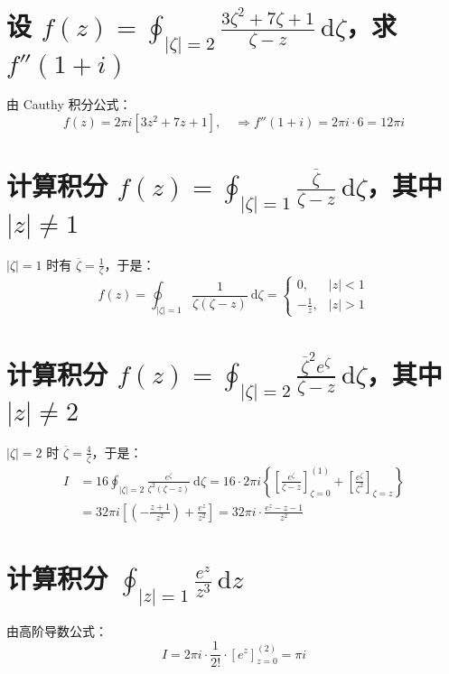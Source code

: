 \documentclass[UTF8]{report}
\theoremstyle{MyLineTheoremStyle} %
\theoremstyle{MyBlockTheoremStyle} %
\theoremstyle{MySubsubsectionStyle} %
\begin{document}
\section{设 $\displaystyle f(z) = \oint_{| \zeta  |= 2} \frac{3 \zeta^2 + 7 \zeta + 1}{\zeta - z} \ \mathrm{d}\zeta $，求 $f''(1+i)$}

由 Cauthy 积分公式：
\begin{equation}
f(z) = 2 \pi i \left[ 3z^2 + 7z + 1 \right],\quad \Longrightarrow  f''(1+i) = 2 \pi i \cdot 6 = 12 \pi i
\end{equation}

\section{计算积分 $\displaystyle f(z) = \oint_{| \zeta | = 1} \frac{\overline{\zeta}}{\zeta - z} \ \mathrm{d}\zeta$，其中 $| z | \ne 1$}

$| \zeta | = 1$ 时有 $\overline{\zeta} = \frac{1}{\zeta}$，于是：
\begin{equation}
f(z) = \oint_{| \zeta | = 1} \frac{1}{\zeta(\zeta - z)} \ \mathrm{d}\zeta =
\begin{cases}
    0, & | z | < 1 \\ 
    -\frac{1}{z}, & | z | > 1
\end{cases}
\end{equation}

\section{计算积分 $\displaystyle f(z) = \oint_{| \zeta | = 2} \frac{\overline{\zeta}^2 e^\zeta}{\zeta - z} \ \mathrm{d}\zeta $，其中 $| z | \ne 2$}

$| \zeta |  = 2$ 时 $\overline{\zeta} = \frac{4}{\zeta}$，于是：
\begin{align}
I 
&= 16 \oint_{| \zeta | = 2} \frac{e^\zeta}{\zeta^2(\zeta - z)} \ \mathrm{d}\zeta 
= 16 \cdot 2 \pi i \left\{ \left[\frac{e^\zeta}{\zeta - z}\right]^{(1)}_{\zeta = 0} + \left[\frac{e^\zeta}{\zeta^2}\right]_{\zeta = z}\right\} \\
&= 32 \pi i \left[ \left(-\frac{z+1}{z^2}\right) + \frac{e^z}{z^2}  \right] = 32 \pi i \cdot \frac{e^z - z - 1}{z^2} 
\end{align}

\section{计算积分 $\displaystyle \oint_{| z | = 1} \frac{e^z }{z^3} \ \mathrm{d}z$}
由高阶导数公式：
\begin{equation}
I = 2 \pi i \cdot \frac{1}{2!} \cdot\left[e^z \right]^{(2)}_{z = 0} =  \pi i
\end{equation}
\end{document}
